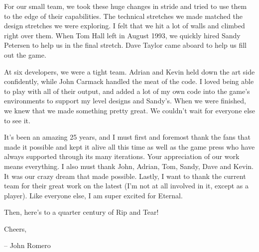 \par
For our small team, we took these huge changes in stride and tried to use them to the edge of their capabilities. The technical stretches we made matched the design stretches we were exploring. I felt that we hit a lot of walls and climbed right over them. When Tom Hall left in August 1993, we quickly hired Sandy Petersen to help us in the final stretch. Dave Taylor came aboard to help us fill out the game.\\
\par
At six developers, we were a tight team. Adrian and Kevin held down the art side confidently, while John Carmack handled the meat of the code. I loved being able to play with all of their output, and added a lot of my own code into the game's environments to support my level designs and Sandy's. When we were finished, we knew that we made something pretty great. We couldn't wait for everyone else to see it.\\
\par
It's been an amazing 25 years, and I must first and foremost thank the fans that made it possible and kept it alive all this time as well as the game press who have always supported \doom{} through its many iterations. Your appreciation of our work means everything. I also must thank John, Adrian, Tom, Sandy, Dave and Kevin. It was our crazy dream that made \doom{} possible. Lastly, I want to thank the current \doom{} team for their great work on the latest \doom{} (I'm not at all involved in it, except as a player). Like everyone else, I am super excited for \doom{} Eternal.\\
\par
Then, here's to a quarter century of Rip and Tear!\\
\par
Cheers,\\
\par
-- John Romero\\
\par
\thispagestyle{plain} %
